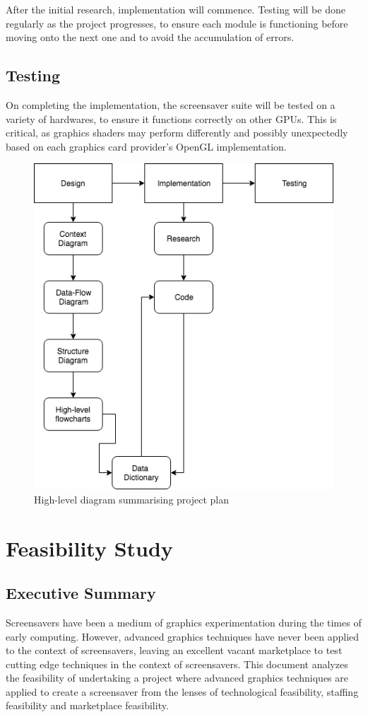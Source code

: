 \documentclass[10pt, openany]{book}
\begin{document}
After the initial research, implementation will commence. Testing will be done regularly as the project progresses, to ensure each module is functioning before moving onto the next one and to avoid the accumulation of errors. 

\section{Testing}
On completing the implementation, the screensaver suite will be tested on a variety of hardwares, to ensure it functions correctly on other GPUs. This is critical, as graphics \gls{shader}s may perform differently and possibly unexpectedly based on each graphics card provider's \gls{OpenGL} implementation.

\begin{figure}[H]
	\centering
	\includegraphics[width=0.6\linewidth]{project-plan}
	\caption{High-level diagram summarising project plan}
\end{figure}	

\chapter{Feasibility Study}

\section{Executive Summary}

Screensavers have been a medium of graphics experimentation during the times of early computing. However, advanced graphics techniques have never been applied to the context of screensavers, leaving an excellent vacant marketplace to test cutting edge techniques in the context of screensavers. This document analyzes the feasibility of undertaking a project where advanced graphics techniques are applied to create a screensaver from the lenses of technological feasibility, staffing feasibility and marketplace feasibility.
\end{document}
